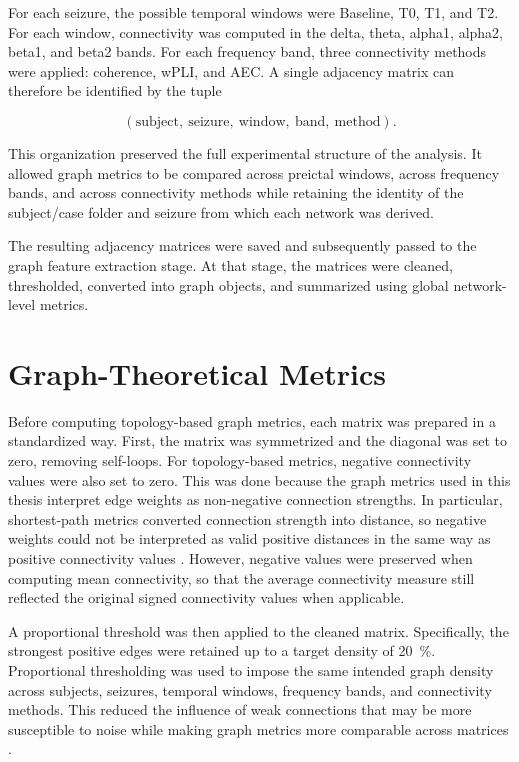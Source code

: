 For each seizure, the possible temporal windows were Baseline, T0, T1, and T2.
For each window, connectivity was computed in the delta, theta, alpha1,
alpha2, beta1, and beta2 bands. For each frequency band, three connectivity
methods were applied: coherence, wPLI, and AEC. A single adjacency matrix can
therefore be identified by the tuple

\[
    (\text{subject},\ \text{seizure},\ \text{window},\ \text{band},\
    \text{method}).
\]

This organization preserved the full experimental structure of the analysis.
It allowed graph metrics to be compared across preictal windows, across
frequency bands, and across connectivity methods while retaining the identity
of the subject/case folder and seizure from which each network was derived.

The resulting adjacency matrices were saved and subsequently passed to the
graph feature extraction stage. At that stage, the matrices were cleaned,
thresholded, converted into graph objects, and summarized using global
network-level metrics.

\section{Graph-Theoretical Metrics}
\label{sec:graph-theoretical-metrics}

Before computing topology-based graph metrics, each matrix was prepared in a
standardized way. First, the matrix was symmetrized and the diagonal was set to
zero, removing self-loops. For topology-based metrics, negative connectivity values were also set to zero.
This was done because the graph metrics used in this thesis interpret edge
weights as non-negative connection strengths. In particular, shortest-path
metrics converted connection strength into distance, so negative weights could
not be interpreted as valid positive distances in the same way as positive
connectivity values \cite{Rubinov2010,Rubinov2011}. However, negative values
were preserved when computing mean connectivity, so that the average
connectivity measure still reflected the original signed connectivity values
when applicable.

A proportional threshold was then applied to the cleaned matrix. Specifically,
the strongest positive edges were retained up to a target density of
\SI{20}{\percent}. Proportional thresholding was used to impose the same
intended graph density across subjects, seizures, temporal windows, frequency
bands, and connectivity methods. This reduced the influence of weak connections
that may be more susceptible to noise while making graph metrics more
comparable across matrices \cite{VanWijk2010,Garrison2015,Adamovich2022}.

